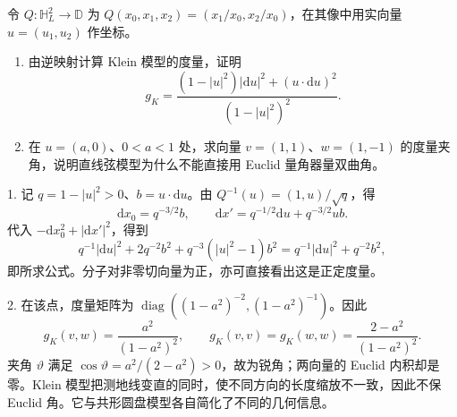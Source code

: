 \begin{exercise}
	\label{g1:ex:klein-metric-angles}
	令 \(Q:\mathbb H_L^2\to\mathbb D\) 为 \(Q(x_0,x_1,x_2)=(x_1/x_0,x_2/x_0)\)，在其像中用实向量 \(u=(u_1,u_2)\) 作坐标。
	\begin{enumerate}
		\item 由逆映射计算 Klein 模型的度量，证明
		\[
			g_K=\frac{(1-|u|^2)|\mathrm{d}u|^2+(u\cdot\mathrm{d}u)^2}{(1-|u|^2)^2}.
		\]
		\item 在 \(u=(a,0)\)、\(0<a<1\) 处，求向量 \(v=(1,1)\)、\(w=(1,-1)\) 的度量夹角，说明直线弦模型为什么不能直接用 Euclid 量角器量双曲角。
	\end{enumerate}
\end{exercise}
\begin{solution}
	1. 记 \(q=1-|u|^2>0\)、\(b=u\cdot\mathrm{d}u\)。由 \(Q^{-1}(u)=(1,u)/\sqrt q\)，得
	\[
		\mathrm{d}x_0=q^{-3/2}b,\qquad
		\mathrm{d}x'=q^{-1/2}\mathrm{d}u+q^{-3/2}ub.
	\]
	代入 \(-\mathrm{d}x_0^2+|\mathrm{d}x'|^2\)，得到
	\[
		q^{-1}|\mathrm{d}u|^2+2q^{-2}b^2+q^{-3}(|u|^2-1)b^2
		=q^{-1}|\mathrm{d}u|^2+q^{-2}b^2,
	\]
	即所求公式。分子对非零切向量为正，亦可直接看出这是正定度量。

	2. 在该点，度量矩阵为 \(\operatorname{diag}((1-a^2)^{-2},(1-a^2)^{-1})\)。因此
	\[
		g_K(v,w)=\frac{a^2}{(1-a^2)^2},\qquad
		g_K(v,v)=g_K(w,w)=\frac{2-a^2}{(1-a^2)^2}.
	\]
	夹角 \(\vartheta\) 满足 \(\cos\vartheta=a^2/(2-a^2)>0\)，故为锐角；两向量的 Euclid 内积却是零。Klein 模型把测地线变直的同时，使不同方向的长度缩放不一致，因此不保 Euclid 角。它与共形圆盘模型各自简化了不同的几何信息。
\end{solution}

